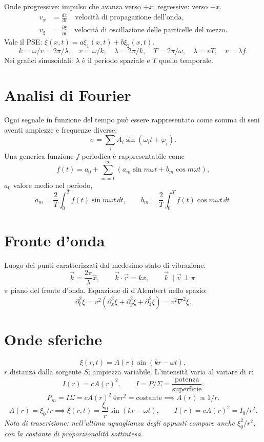 \documentclass[11pt,a4paper]{article}
\newcommand{\pagina}[1]{\clearpage}
\newcommand{\vv}[1]{\vec{#1}}
\begin{document}
Onde progressive: impulso che avanza verso $+x$; regressive: verso $-x$.
\begin{align*}v_x&=\frac{dx}{dt}\quad\text{velocità di propagazione dell'onda},\\ v_\xi&=\frac{\partial\xi}{\partial t}\quad\text{velocità di oscillazione delle particelle del mezzo}.\end{align*}
Vale il PSE: $\xi(x,t)=a\xi_1(x,t)+b\xi_2(x,t)$.
\[k=\omega/v=2\pi/\lambda,\quad v=\omega/k,\quad\lambda=2\pi/k,\quad T=2\pi/\omega,\quad\lambda=vT,\quad v=\lambda f.\]
Nei grafici sinusoidali: $\lambda$ è il periodo spaziale e $T$ quello temporale.
\pagina{9}\section*{Analisi di Fourier}
Ogni segnale in funzione del tempo può essere rappresentato come somma di seni aventi ampiezze e frequenze diverse:
\[\sigma=\sum_i A_i\sin(\omega_it+\varphi_i).\]
Una generica funzione $f$ periodica è rappresentabile come
\[f(t)=a_0+\sum_{m=1}^\infty\left(a_m\sin m\omega t+b_m\cos m\omega t\right),\]
$a_0$ valore medio nel periodo,
\[a_m=\frac2T\int_0^Tf(t)\sin m\omega t\,dt,\qquad b_m=\frac2T\int_0^Tf(t)\cos m\omega t\,dt.\]
\section*{Fronte d'onda}
Luogo dei punti caratterizzati dal medesimo stato di vibrazione.
\[\vv k=\frac{2\pi}\lambda\hat x,\qquad\vv k\cdot\vv r=kx,\qquad\vv k\parallel\vv v\perp\pi.\]
$\pi$ piano del fronte d'onda. Equazione di d'Alembert nello spazio:
\[\partial_t^2\xi=v^2(\partial_x^2\xi+\partial_y^2\xi+\partial_z^2\xi)=v^2\nabla^2\xi.\]
\pagina{10}\section*{Onde sferiche}
\[\xi(r,t)=A(r)\sin(kr-\omega t),\]
$r$ distanza dalla sorgente $S$; ampiezza variabile. L'intensità varia al variare di $r$:
\[I(r)=cA(r)^2,\qquad I=P/\Sigma=\frac{\text{potenza}}{\text{superficie}}.\]
\[P_m=I\Sigma=cA(r)^2\,4\pi r^2=\text{costante}\implies A(r)\propto1/r.\]
\[A(r)=\xi_0/r\implies\xi(r,t)=\frac{\xi_0}r\sin(kr-\omega t),\qquad I(r)=cA(r)^2=I_0/r^2.\]
\textit{Nota di trascrizione: nell'ultima uguaglianza degli appunti compare anche $\xi_0^2/r^2$, con la costante di proporzionalità sottintesa.}
\end{document}
